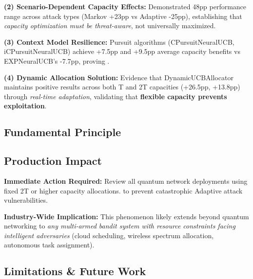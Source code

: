 \textbf{(2) Scenario-Dependent Capacity Effects:} Demonstrated 48pp performance range across attack types (Markov +23pp vs Adaptive -25pp), establishing that \textit{capacity optimization must be threat-aware}, not universally maximized.

\textbf{(3) Context Model Resilience:} Pursuit algorithms (CPursuitNeuralUCB, iCPursuitNeuralUCB) achieve +7.5pp and +9.5pp average capacity benefits vs EXPNeuralUCB's -7.7pp, proving .

\textbf{(4) Dynamic Allocation Solution:} Evidence that DynamicUCBAllocator maintains positive results across both T and 2T capacities (+26.5pp, +13.8pp) through \textit{real-time adaptation}, validating that \textbf{flexible capacity prevents exploitation}.

\subsection{Fundamental Principle}

\begin{center}
\end{center}

\subsection{Production Impact}

\textbf{Immediate Action Required:} Review all quantum network deployments using fixed 2T or higher capacity allocations.  to prevent catastrophic Adaptive attack vulnerabilities.

\textbf{Industry-Wide Implication:} This phenomenon likely extends beyond quantum networking to \textit{any multi-armed bandit system with resource constraints facing intelligent adversaries} (cloud scheduling, wireless spectrum allocation, autonomous task assignment).

\subsection{Limitations \& Future Work}

